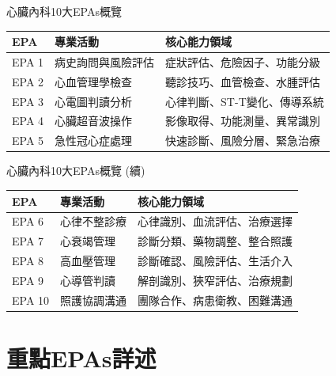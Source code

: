 \documentclass[aspectratio=169]{beamer}
\begin{document}
\begin{frame}{心臟內科10大EPAs概覽}
\footnotesize
\begin{table}
\centering
\begin{tabular}{|p{1cm}|p{4cm}|p{6cm}|}
\hline
\rowcolor{emergency_blue!20}
\textbf{EPA} & \textbf{專業活動} & \textbf{核心能力領域} \\
\hline
EPA 1 & 病史詢問與風險評估 & 症狀評估、危險因子、功能分級 \\
\hline
EPA 2 & 心血管理學檢查 & 聽診技巧、血管檢查、水腫評估 \\
\hline
EPA 3 & 心電圖判讀分析 & 心律判斷、ST-T變化、傳導系統 \\
\hline
EPA 4 & 心臟超音波操作 & 影像取得、功能測量、異常識別 \\
\hline
EPA 5 & 急性冠心症處理 & 快速診斷、風險分層、緊急治療 \\
\hline
\end{tabular}
\end{table}
\end{frame}

\begin{frame}{心臟內科10大EPAs概覽 (續)}
\footnotesize
\begin{table}
\centering
\begin{tabular}{|p{1cm}|p{4cm}|p{6cm}|}
\hline
\rowcolor{emergency_blue!20}
\textbf{EPA} & \textbf{專業活動} & \textbf{核心能力領域} \\
\hline
EPA 6 & 心律不整診療 & 心律識別、血流評估、治療選擇 \\
\hline
EPA 7 & 心衰竭管理 & 診斷分類、藥物調整、整合照護 \\
\hline
EPA 8 & 高血壓管理 & 診斷確認、風險評估、生活介入 \\
\hline
EPA 9 & 心導管判讀 & 解剖識別、狹窄評估、治療規劃 \\
\hline
EPA 10 & 照護協調溝通 & 團隊合作、病患衛教、困難溝通 \\
\hline
\end{tabular}
\end{table}
\end{frame}

\section{重點EPAs詳述}
\end{document}
